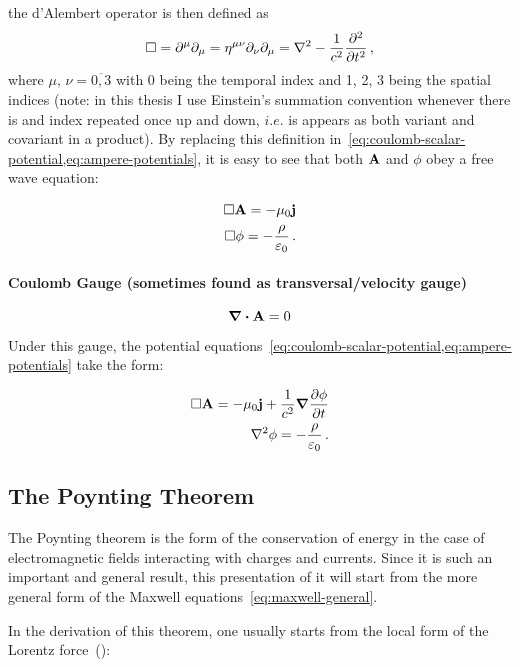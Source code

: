 \documentclass[12pt, class=report, crop=false]{standalone}
\begin{document}
the d'Alembert operator is then defined as
\[
\Box = \partial^{\mu} \partial_{\mu} = \eta^{\mu \nu} \partial_{\nu} \partial_{\mu} = \laplacian{} - \frac{1}{c^{2}} \pdv[2]{}{t} \,,
\]
where \(\mu,\,\nu=\overline{0,3}\) with 0 being the temporal index and 1, 2, 3 being the spatial indices (note: in this thesis I use Einstein's summation convention whenever there is and index repeated once up and down, \(\textit{i}.\textit{e}.\) is appears as both variant and covariant in a product). By replacing this definition in~\cref{eq:coulomb-scalar-potential,eq:ampere-potentials}, it is easy to see that both \(\vb{A}\) and \(\phi\) obey a free wave equation:

\begin{subequations}
  \begin{align}
    \Box \vb{A} = -\mu_0 \vb{j}\\
    \Box \phi = -\frac{\rho}{\varepsilon_0}  \,.
  \end{align}
\end{subequations}

\paragraph{Coulomb Gauge (sometimes found as transversal/velocity gauge)}

\begin{equation}
  \div{\vb{A}} = 0
\end{equation}

\par
Under this gauge, the potential equations~\cref{eq:coulomb-scalar-potential,eq:ampere-potentials} take the form:

\begin{subequations}
  \begin{align}
    \Box \vb{A} = -\mu_0 \vb{j} + \frac{1}{c^{2}} \grad{\pdv{\phi}{t}}\\
    \laplacian{\phi} = -\frac{\rho}{\varepsilon_0}  \,.
  \end{align}
\end{subequations}

\subsection{The Poynting Theorem}
\label{section:poynting}
The Poynting theorem is the form of the conservation of energy in the case of electromagnetic fields interacting with charges and currents. Since it is such an important and general result, this presentation of it will start from the more general form of the Maxwell equations~\cref{eq:maxwell-general}.
\par
In the derivation of this theorem, one usually starts from the local form of the Lorentz force~(\cite{griffithsIntroductionElectrodynamics1999}):
\end{document}
